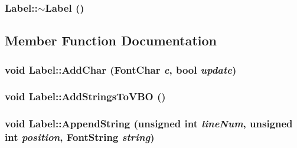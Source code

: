 \hypertarget{class_label_39e1167a9b5827afd888780973d88894}{
\subsubsection[{$\sim$Label}]{\setlength{\rightskip}{0pt plus 5cm}Label::$\sim$Label ()}}
\label{class_label_39e1167a9b5827afd888780973d88894}




\subsection{Member Function Documentation}
\hypertarget{class_label_4049a5e443fb19729c07542feb34e2b6}{
\subsubsection[{AddChar}]{\setlength{\rightskip}{0pt plus 5cm}void Label::AddChar ({\bf FontChar} {\em c}, \/  bool {\em update})}}
\label{class_label_4049a5e443fb19729c07542feb34e2b6}


\hypertarget{class_label_95db1d28f73e679156239672f3f3802a}{
\subsubsection[{AddStringsToVBO}]{\setlength{\rightskip}{0pt plus 5cm}void Label::AddStringsToVBO ()}}
\label{class_label_95db1d28f73e679156239672f3f3802a}


\hypertarget{class_label_6cc69098d090f7b943bbd6e7a313967b}{
\subsubsection[{AppendString}]{\setlength{\rightskip}{0pt plus 5cm}void Label::AppendString (unsigned int {\em lineNum}, \/  unsigned int {\em position}, \/  {\bf FontString} {\em string})}}
\label{class_label_6cc69098d090f7b943bbd6e7a313967b}


